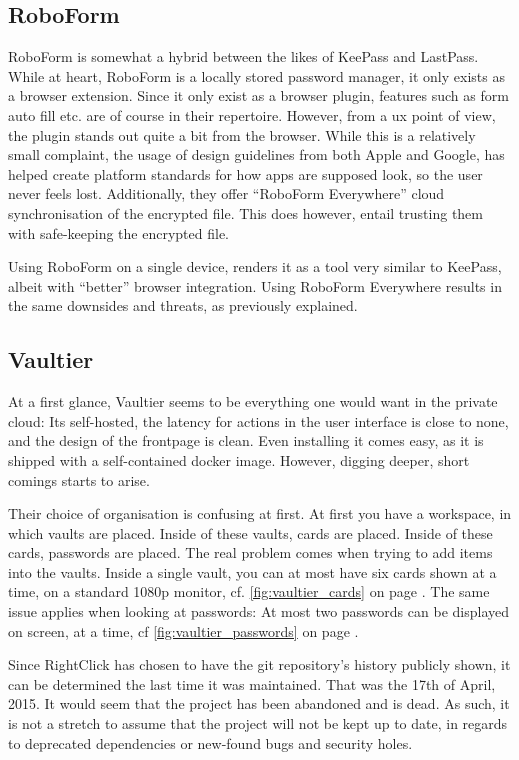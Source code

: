 		\subsection*{RoboForm}
			RoboForm\cite{roboform} is somewhat a hybrid between the likes of KeePass and LastPass. While at heart, RoboForm is a locally stored password manager, it only exists as a browser extension. Since it only exist as a browser plugin, features such as form auto fill etc. are of course in their repertoire. However, from a ux point of view, the plugin stands out quite a bit from the browser. While this is a relatively small complaint, the usage of design guidelines from both Apple and Google, has helped create platform standards for how apps are supposed look, so the user never feels lost. Additionally, they offer ``RoboForm Everywhere'' cloud synchronisation of the encrypted file. This does however, entail trusting them with safe-keeping the encrypted file.

			Using RoboForm on a single device, renders it as a tool very similar to KeePass, albeit with ``better'' browser integration. Using RoboForm Everywhere results in the same downsides and threats, as previously explained.

		\subsection*{Vaultier}
			At a first glance, Vaultier\cite{vaultier} seems to be everything one would want in the private cloud: Its self-hosted, the latency for actions in the user interface is close to none, and the design of the frontpage is clean. Even installing it comes easy, as it is shipped with a self-contained docker image. However, digging deeper, short comings starts to arise.

			Their choice of organisation is confusing at first. At first you have a workspace, in which vaults are placed. Inside of these vaults, cards are placed. Inside of these cards, passwords are placed. The real problem comes when trying to add items into the vaults. Inside a single vault, you can at most have six cards shown at a time, on a standard 1080p monitor, cf. \ref{fig:vaultier_cards} on page \pageref{fig:vaultier_cards}. The same issue applies when looking at passwords: At most two passwords can be displayed on screen, at a time, cf \ref{fig:vaultier_passwords} on page \pageref{fig:vaultier_passwords}.

			Since RightClick has chosen to have the git repository's history publicly shown, it can be determined the last time it was maintained. That was the 17th of April, 2015\cite{vaultier_history}. It would seem that the project has been abandoned and is dead. As such, it is not a stretch to assume that the project will not be kept up to date, in regards to deprecated dependencies or new-found bugs and security holes.



